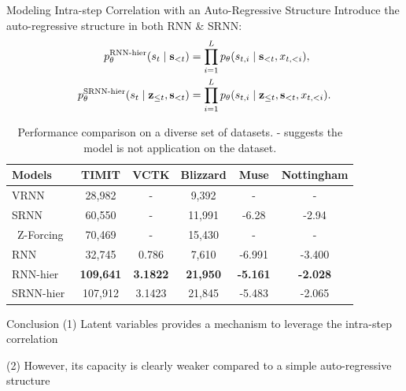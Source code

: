 \documentclass[final]{beamer}
\newlength{\colwidth}
\begin{document}
\begin{frame}[t]
\begin{columns}[t]
\begin{column}{\colwidth}
\begin{block}{Modeling Intra-step Correlation with an Auto-Regressive Structure}
	Introduce the auto-regressive structure in both RNN \& SRNN:
	\begin{align}
	\label{eqn:ar_rnn_out_dist}
	p_\theta^\text{RNN-hier}(s_t \mid {\mathbf{s}}_{<t})
	&= \prod_{i=1}^{L} p_{\theta}(s_{t,i} \mid {\mathbf{s}}_{<t}, x_{t,<i}), \\
	\label{eqn:ar_srnn_out_dist}
	p_\theta^\text{SRNN-hier}(s_t \mid {\mathbf{z}}_{\le t}, {\mathbf{s}}_{<t})
	&= \prod_{i=1}^{L} p_{\theta}(s_{t,i} \mid {\mathbf{z}}_{\le t}, {\mathbf{s}}_{<t}, x_{t,<i}).
	\end{align}
	\begin{table}[!t]
		\centering
		\small
		\begin{tabular}{l|c c c | c c }
			\toprule
			\bf Models          & \bf TIMIT & \bf VCTK  & \bf Blizzard  & \bf Muse  & \bf Nottingham \\
			\midrule
			VRNN~\cite{chung2015recurrent}      & 28,982      & -          & 9,392      &  -         &  -      \\
			SRNN~\cite{fraccaro2016sequential}      & 60,550      & -          & 11,991     &  -6.28     &  -2.94     \\\
			Z-Forcing~\cite{goyal2017z}  & 70,469 & -          & 15,430     &  -         &  -       \\
			\midrule
			RNN               & 32,745      & 0.786      & 7,610     & -6.991     & -3.400     \\
			\midrule\midrule
			RNN-hier            & \textbf{109,641}     & \textbf{3.1822}     & \textbf{21,950}     & \textbf{-5.161} & \textbf{-2.028} \\
			SRNN-hier           & 107,912     & 3.1423     & 21,845     & -5.483     & -2.065    \\
			\bottomrule
		\end{tabular}
		\caption{Performance comparison on a diverse set of datasets. - suggests the model is not application on the dataset. }
		\label{tab:non_factorized}
		\vspace{-1.5em}
	\end{table}
	\vspace{-1.0em}
\end{block}

\begin{block}{Conclusion}
	(1) Latent variables provides a mechanism to leverage the intra-step correlation
	
	(2) However, its capacity is clearly weaker compared to a simple auto-regressive structure
\end{block}


\end{column}
\end{columns}
\end{frame}
\end{document}
